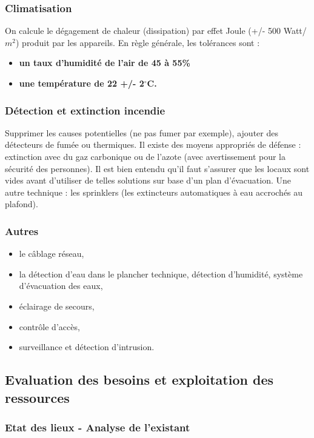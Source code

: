 \documentclass[10pt,a4paper,oneside,titlepage]{report}
\begin{document}
\subsubsection{Climatisation}

On calcule le dégagement de chaleur (dissipation) par effet Joule (+/- 500 Watt/$m^2$) produit par les appareils. En règle générale, les tolérances sont : \begin{itemize}
\item \textbf{un taux d'humidité de l'air de 45 à 55\%}
\item \textbf{une température de 22 +/- 2$^\circ$C.}
\end{itemize}

\subsubsection{Détection et extinction incendie}

Supprimer les causes potentielles (ne pas fumer par exemple), ajouter des détecteurs de fumée ou thermiques. Il existe des moyens appropriés de défense : extinction avec du gaz carbonique ou de l'azote (avec avertissement pour la sécurité des
personnes). Il est bien entendu qu'il faut s'assurer que les locaux sont vides avant d'utiliser de telles solutions sur base d'un plan d'évacuation. Une autre technique : les sprinklers (les extincteurs automatiques à eau accrochés au plafond).

\subsubsection{Autres}

\begin{itemize}
\item le c\^ablage réseau,
\item la détection d'eau dans le plancher technique, détection d'humidité, système d'évacuation des eaux,
\item éclairage de secours,
\item contr\^ole d'accès,
\item surveillance et détection d'intrusion.
\end{itemize}

\subsection{Evaluation des besoins et exploitation des ressources}

\subsubsection{Etat des lieux - Analyse de l'existant}
\end{document}
